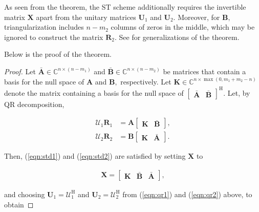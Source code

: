 As seen from the theorem, the ST scheme additionally requires the invertible matrix $\boldsymbol{X}$ apart from the unitary matrices $\boldsymbol{U}_1$ and $\boldsymbol{U}_2.$ Moreover, for $\boldsymbol{B},$ triangularization includes $n-m_2$ columns of zeros in the middle, which may be ignored to construct the matrix $\boldsymbol{R}_2.$ See \cite{Krishnamoorthy2021} for generalizations of the theorem.

Below is the proof of the theorem.

\begin{proof}
Let  $\bar{\boldsymbol{A}} \in \mathbb{C}^{n\times (n-m_1)}$ and $\bar{\boldsymbol{B}} \in \mathbb{C}^{n\times (n-m_2)}$ be matrices that contain a basis for the null space of $\boldsymbol{A}$ and $\boldsymbol{B},$ respectively. Let $\boldsymbol{K} \in \mathbb{C}^{n\times \max(0,m_1+m_2-n)}$ denote the matrix containing a basis for the null space of $\begin{bmatrix} \bar{\boldsymbol{A}} & \bar{\boldsymbol{B}}\end{bmatrix}^\mathrm{H}.$ Let, by QR decomposition,

\begin{align}\boldsymbol{\mathcal{U}}_1 \boldsymbol{R}_1 &= \boldsymbol{A} \begin{bmatrix}\boldsymbol{K} & \bar{\boldsymbol{B}}\end{bmatrix}, \label{eqn:qr1}\\ \boldsymbol{\mathcal{U}}_2 \boldsymbol{R}_2 &= \boldsymbol{B} \begin{bmatrix}\boldsymbol{K} & \bar{\boldsymbol{A}}\end{bmatrix}.\label{eqn:qr2}\end{align}

Then, (\ref{eqn:std1}) and (\ref{eqn:std2}) are satisfied by setting $\boldsymbol{X}$ to

\begin{align}\boldsymbol{X} = \begin{bmatrix}\boldsymbol{K} & \bar{\boldsymbol{B}} & \bar{\boldsymbol{A}}\end{bmatrix}, \label{eqn:x}\end{align}

and choosing $\boldsymbol{U}_1 = \boldsymbol{\mathcal{U}}_1^\mathrm{H}$ and $\boldsymbol{U}_2 = \boldsymbol{\mathcal{U}}_2^\mathrm{H}$ from (\ref{eqn:qr1}) and (\ref{eqn:qr2}) above, to obtain


\end{proof}
